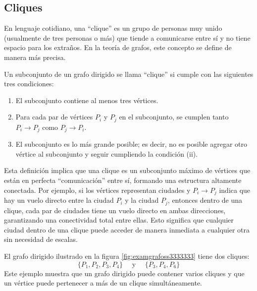 \subsection*{Cliques}

En lenguaje cotidiano, una “clique” es un grupo de personas muy unido (usualmente de tres personas o más) que tiende a comunicarse entre sí y no tiene espacio para los extraños. En la teoría de grafos, este concepto se define de manera más precisa.

\begin{definicion}{}{}
    Un subconjunto de un grafo dirigido se llama “clique” si cumple con las siguientes tres condiciones:
    \begin{enumerate}[label=\roman*), topsep=6pt, itemsep=0pt]
        \item El subconjunto contiene al menos tres vértices.
        \item Para cada par de vértices $P_i$ y $P_j$ en el subconjunto, se cumplen tanto $P_i \rightarrow P_j$ como $P_j \rightarrow P_i$.
        \item El subconjunto es lo más grande posible; es decir, no es posible agregar otro vértice al subconjunto y seguir cumpliendo la condición (ii).
    \end{enumerate}
\end{definicion}

Esta definición implica que una clique es un subconjunto máximo de vértices que están en perfecta “comunicación” entre sí, formando una estructura altamente conectada. Por ejemplo, si los vértices representan ciudades y $P_i \rightarrow P_j$ indica que hay un vuelo directo entre la ciudad $P_i$ y la ciudad $P_j$, entonces dentro de una clique, cada par de ciudades tiene un vuelo directo en ambas direcciones, garantizando una conectividad total entre ellas. Esto significa que cualquier ciudad dentro de una clique puede acceder de manera inmediata a cualquier otra sin necesidad de escalas.

\begin{examplebox}{}{}
    El grafo dirigido ilustrado en la figura \ref{fig:examgrafoss3333333} tiene dos cliques:
    $$\{P_1, P_2, P_3, P_4\} \quad \text{ y } \quad \{P_3, P_4, P_6\}$$
    Este ejemplo muestra que un grafo dirigido puede contener varios cliques y que un vértice puede pertenecer a más de un clique simultáneamente.
\end{examplebox}

\newpage

